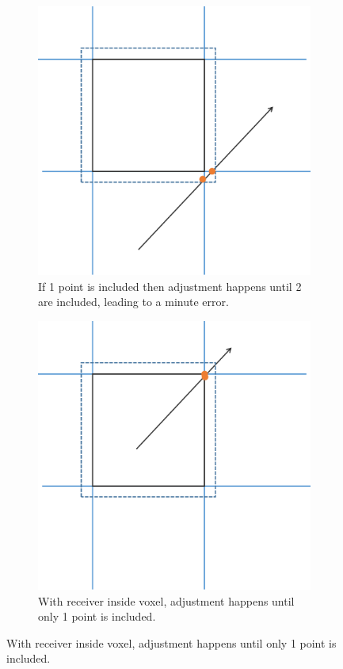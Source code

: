 \documentclass[12pt,a4paper]{article}
\begin{document}
\begin{figure}[p]
	\begin{subfigure}[t]{0.45\textwidth}
		\centering
		\includegraphics[width=0.8\linewidth]{ray_negligible_1}
		\caption{If 1 point is included then adjustment happens until 2 are included, leading to a minute error.}
		\label{fig:ray_negligible_1}
	\end{subfigure}
	\hfill
	\begin{subfigure}[t]{0.45\textwidth}
		\centering
		\includegraphics[width=0.8\linewidth]{ray_negligible_2}
		\caption{With receiver inside voxel, adjustment happens until only 1 point is included.}
		\label{fig:ray_negligible_2}
	\end{subfigure}
	\medskip %


\end{figure}
\end{document}
